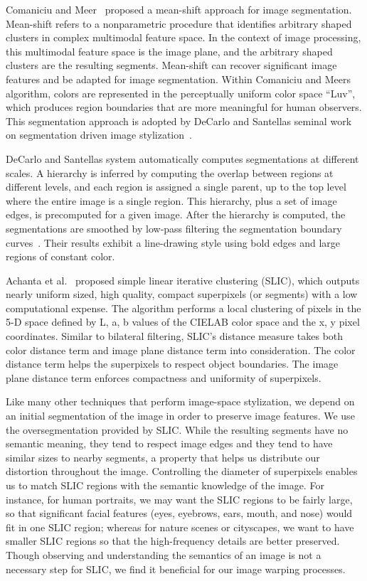 Comaniciu and Meer~\cite{meanshift} proposed a mean-shift approach for image segmentation. Mean-shift refers to a nonparametric procedure that identifies arbitrary shaped clusters in complex multimodal feature space. In the context of image processing, this multimodal feature space is the image plane, and the arbitrary shaped clusters are the resulting segments. Mean-shift can recover significant image features and be adapted for image segmentation. Within Comaniciu and Meer\textquotesingle s algorithm, colors are represented in the perceptually uniform color space ``Luv'', which produces region boundaries that are more meaningful for human observers. This segmentation approach is adopted by DeCarlo and Santella\textquotesingle s seminal work on segmentation driven image stylization~\cite{decarlo}. 

DeCarlo and Santella\textquotesingle s system automatically computes segmentations at different scales. A hierarchy is inferred by computing the overlap between regions at different levels, and each region is assigned a single parent, up to the top level where the entire image is a single region. This hierarchy, plus a set of image edges, is precomputed for a given image. After the hierarchy is computed, the segmentations are smoothed by low-pass filtering the segmentation boundary curves~\cite{NPRbook}. Their results exhibit a line-drawing style using bold edges and large regions of constant color. 

Achanta et al.~\cite{SLIC} proposed simple linear iterative clustering (SLIC), which outputs nearly uniform sized, high quality, compact superpixels (or segments) with a low computational expense. The algorithm performs a local clustering of pixels in the 5-D space defined by L, a, b values of the CIELAB color space and the x, y pixel coordinates. Similar to bilateral filtering, SLIC’s distance measure takes both color distance term and image plane distance term into consideration. The color distance term helps the superpixels to respect object boundaries. The image plane distance term enforces compactness and uniformity of superpixels. 

Like many other techniques that perform image-space stylization, we depend on an
initial segmentation of the image in order to preserve image features. We use 
the oversegmentation provided by SLIC. 
While the resulting segments have no semantic meaning, they
tend to respect image edges and they tend to have similar sizes to nearby
segments, a property that helps us distribute our distortion throughout the
image. Controlling the diameter of superpixels enables us to match SLIC regions with the semantic knowledge of the image. For instance, for human portraits, we may want the SLIC regions to be fairly large, so that significant facial features (eyes, eyebrows, ears, mouth, and nose) would fit in one SLIC region; whereas for nature scenes or cityscapes, we want to have smaller SLIC regions so that the high-frequency details are better preserved. Though observing and understanding the semantics of an image is not a necessary step for SLIC, we find it beneficial for our image warping processes.

